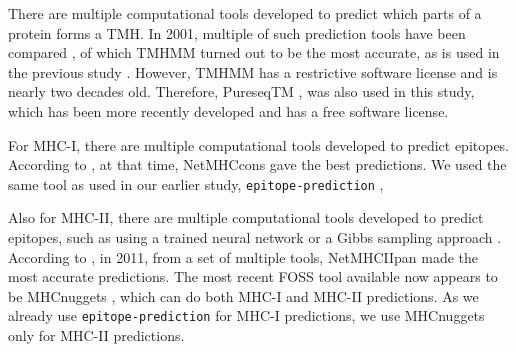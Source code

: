 
There are multiple computational tools developed to predict which
parts of a protein forms a TMH.
In 2001, multiple of such prediction tools have been compared \cite{moller2001evaluation},
of which TMHMM \cite{krogh2001predicting} turned out to be the most accurate, 
as is used in the previous study \cite{bianchi2017}.
However, TMHMM has a restrictive software license and is nearly two
decades old.
Therefore, PureseqTM \cite{wang2019efficient},
was also used in this study, which has been more recently developed
and has a free software license.


For MHC-I, there are multiple computational tools developed 
to predict epitopes. 
According to \cite{lundegaard2011prediction}, at that time,
NetMHCcons \cite{karosiene2012netmhccons} gave the best predictions.
We used the same tool as used in our earlier study, 
\verb;epitope-prediction; \cite{bianchi2017},


Also for MHC-II, there are multiple computational tools developed 
to predict epitopes,
such as using a trained neural network \cite{nielsen2003reliable}
or a Gibbs sampling approach \cite{nielsen2004improved}.
According to \cite{lundegaard2011prediction}, in 2011,
from a set of multiple tools, 
\mbox{NetMHCIIpan} \cite{nielsen2008quantitative,karosiene2013netmhciipan}
made the most accurate predictions.
The most recent FOSS tool available now appears
to be MHCnuggets \cite{shao2020high}, which can do both MHC-I 
and MHC-II predictions. 
As we already use \verb;epitope-prediction; \cite{bianchi2017} 
for MHC-I predictions, we use MHCnuggets only for MHC-II predictions.


